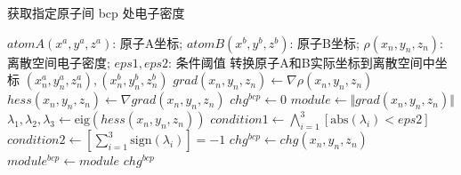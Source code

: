 \documentclass[UTF8, a4paper, 12pt, fontset=windows]{ctexart}
\renewcommand{\algorithmicrequire}{\textbf{输入:}}
\renewcommand{\algorithmicensure}{\textbf{输出:}}
\begin{document}
        \newpage

\begin{algorithm}
	\renewcommand{\algorithmicrequire}{\textbf{Input:}}
	\renewcommand{\algorithmicensure}{\textbf{Output:}}

        \caption{获取指定原子间 bcp 处电子密度}
	\label{alg1}
	\begin{algorithmic}[1]
                \Require 
                        $atomA(x^a,y^a,z^a)$: 原子A坐标;
                        $atomB(x^b,y^b,z^b)$: 原子B坐标;
                        $\rho(x_n,y_n,z_n)$: 离散空间电子密度;
                        $eps1,eps2$: 条件阈值
                \State 转换原子A和B实际坐标到离散空间中坐标 $(x_n^a,y_n^a,z_n^a),(x_n^b,y_n^b,z_n^b)$
                \State $ grad(x_n,y_n,z_n) \gets \nabla \rho(x_n,y_n,z_n)$
                \State $ hess(x_n,y_n,z_n) \gets \nabla grad(x_n,y_n,z_n)$
                \State $ chg^{bcp} \gets 0$
                        \State $ module \gets \Vert grad(x_n,y_n,z_n) \Vert$
                                \State $\lambda_1,\lambda_2,\lambda_3 \gets \mathrm{eig}(hess(x_n,y_n,z_n)) $
                                \State $condition1 \gets \bigwedge_{i=1}^3 \left[\mathrm{abs}(\lambda_i)< eps2\right]$
                                \State $condition2 \gets \left[\sum_{i=1}^3 \mathrm{sign}(\lambda_i)\right] = -1$
                                                \State $chg^{bcp} \gets chg(x_n,y_n,z_n)$
                                                \State $module^{bcp} \gets module $
                                        \EndIf
                                \EndIf
                        \EndIf
                \EndFor
                \EndFor
                \EndFor
                \Ensure $chg^{bcp}$
	\end{algorithmic} 
\end{algorithm}
\end{document}
